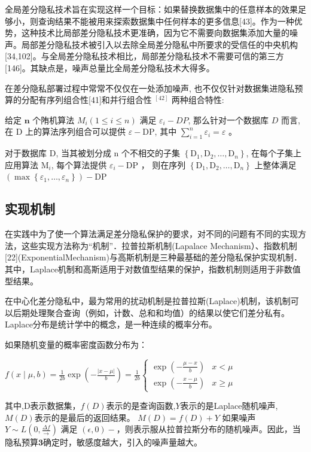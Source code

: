 全局差分隐私技术旨在实现这样一个目标：如果替换数据集中的任意样本的效果足够小，则查询结果不能被用来探索数据集中任何样本的更多信息[43]。作为一种优势，这种技术比局部差分隐私技术更准确，因为它不需要向数据集添加大量的噪声。局部差分隐私技术被引入以去除全局差分隐私中所要求的受信任的中央机构[34,102]。与全局差分隐私技术相比，局部差分隐私技术不需要可信的第三方[146]。其缺点是，噪声总量比全局差分隐私技术大得多。


在差分隐私部署过程中常常不仅仅在一处添加噪声, 也不仅仅针对数据集进隐私预算的分配有序列组合性[41]和并行组合性 ${ }^{[42]}$ 两种组合特性:

\begin{define}[序列组合]\label{序列组合}
给定 $\mathbf{n}$ 个陏机算法 $M_{i}(1 \leq i \leq n)$ 满足 $\varepsilon_{i}-DP$, 那么针对一个数据库 $D$ 而言, 在 $\mathrm{D}$ 上的算法序列组合可以提供 $\varepsilon-\mathrm{DP}$, 其中 $\sum_{i=1}^{n} \varepsilon_{i}=\varepsilon$ 。
\end{define}

\begin{define}[并行组合]\label{并行组合}
对于数据库 $\mathrm{D}$, 当其被划分成 $\mathrm{n}$ 个不相交的子集 $\left\{\mathrm{D}_{1}, \mathrm{D}_{2}, \ldots, \mathrm{D}_{n}\right\}$, 在每个子集上应用算法 $\mathrm{M}_{i}$, 每个算法提供 $\varepsilon_{i}-\mathrm{DP}$ ， 则在序列 $\left\{\mathrm{D}_{1}, \mathrm{D}_{2}, \ldots, \mathrm{D}_{n}\right\}$ 上整体满足 $\left(\max \left\{\varepsilon_{1}, \ldots, \varepsilon_{n}\right\}\right)-\mathrm{DP}$
\end{define}


\subsection{实现机制}
在实践中为了使一个算法满足差分隐私保护的要求，对不同的问题有不同的实现方法，这些实现方法称为“机制”．拉普拉斯机制(Lapalace Mechanism）、指数机制[22](ExponentialMechanism)与高斯机制是三种最基础的差分隐私保护实现机制．其中，Laplace机制和高斯适用于对数值型结果的保护，指数机制则适用于非数值型结果。

在中心化差分隐私中，最为常用的扰动机制是拉普拉斯(Laplace)机制，该机制可以后期处理聚合查询（例如，计数、总和和均值）的结果以使它们差分私有。
Laplace分布是统计学中的概念，是一种连续的概率分布。

\begin{define}[拉普拉斯机制]\label{拉普拉斯机制}
如果随机变量的概率密度函数分布为：

$f(x \mid \mu, b)=\frac{1}{2 b} \exp \left(-\frac{|x-\mu|}{b}\right)=\frac{1}{2 b}\left\{\begin{array}{ll}\exp \left(-\frac{\mu-x}{b}\right) & x<\mu \\ \exp \left(-\frac{x-\mu}{b}\right) & x \geq \mu\end{array}\right.$

其中,D表示数据集，$f(D)$表示的是查询函数,$Y$表示的是Laplace随机噪声,$M(D)$表示的是最后的返回结果。
$M(D)=f(D)+Y$
如果噪声 $Y \sim L\left(0, \frac{\Delta f}{\longrightarrow}\right)$ 满足 $(\epsilon, 0)-$，则表示服从拉普拉斯分布的随机噪声。因此，当隐私预算$\mathbf{3}$确定时，敏感度越大，引入的噪声量越大。
\end{define}

